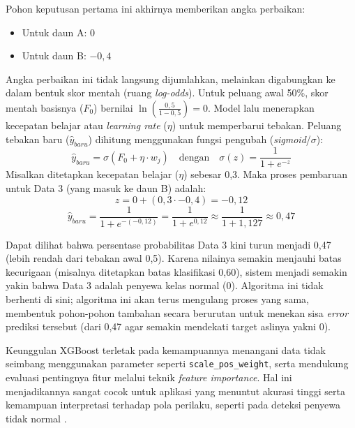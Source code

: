     Pohon keputusan pertama ini akhirnya memberikan angka perbaikan:
    \begin{itemize}
      \item Untuk daun A: $0$
      \item Untuk daun B: $-0{,}4$
    \end{itemize}
    
    Angka perbaikan ini tidak langsung dijumlahkan, melainkan digabungkan ke dalam bentuk skor mentah (ruang {\it log-odds}). Untuk peluang awal 50\%, skor mentah basisnya ($F_0$) bernilai $\ln(\frac{0{,}5}{1-0{,}5}) = 0$. Model lalu menerapkan kecepatan belajar atau {\it learning rate} ($\eta$) untuk memperbarui tebakan. Peluang tebakan baru ($\hat{y}_{baru}$) dihitung menggunakan fungsi pengubah (\textit{sigmoid}/$\sigma$):
    $$
    \hat{y}_{baru} = \sigma(F_0 + \eta \cdot w_j) \quad \text{dengan} \quad \sigma(z) = \frac{1}{1 + e^{-z}}
    $$
    Misalkan ditetapkan kecepatan belajar ($\eta$) sebesar 0,3. Maka proses pembaruan untuk Data 3 (yang masuk ke daun B) adalah:
    $$
    z = 0 + (0{,}3 \cdot -0{,}4) = -0{,}12
    $$
    $$
    \hat{y}_{baru} = \frac{1}{1 + e^{-(-0{,}12)}} = \frac{1}{1 + e^{0{,}12}} \approx \frac{1}{1 + 1{,}127} \approx 0{,}47
    $$
    
    Dapat dilihat bahwa persentase probabilitas Data 3 kini turun menjadi 0,47 (lebih rendah dari tebakan awal 0,5). Karena nilainya semakin menjauhi batas kecurigaan (misalnya ditetapkan batas klasifikasi 0,60), sistem menjadi semakin yakin bahwa Data 3 adalah penyewa kelas normal (0). Algoritma ini tidak berhenti di sini; algoritma ini akan terus mengulang proses yang sama, membentuk pohon-pohon tambahan secara berurutan untuk menekan sisa {\it error} prediksi tersebut (dari 0,47 agar semakin mendekati target aslinya yakni 0).

    Keunggulan XGBoost terletak pada kemampuannya menangani data tidak seimbang menggunakan parameter seperti {\tt scale\_pos\_weight}, serta mendukung evaluasi pentingnya fitur melalui teknik {\it feature importance}. Hal ini menjadikannya sangat cocok untuk aplikasi yang menuntut akurasi tinggi serta kemampuan interpretasi terhadap pola perilaku, seperti pada deteksi penyewa tidak normal \cite{kou2014xgboost}.
